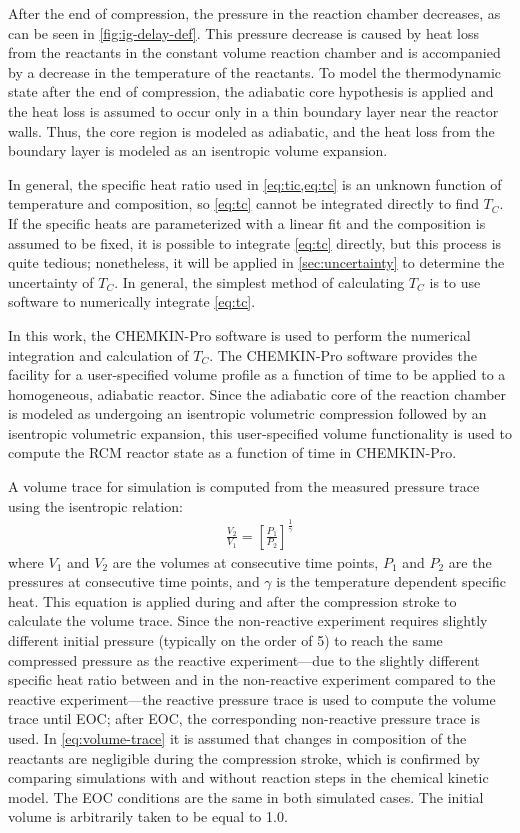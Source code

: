 \documentclass[../main.tex]{subfiles}
\begin{document}
After the end of compression, the pressure in the reaction chamber
decreases, as can be seen in \cref{fig:ig-delay-def}. This pressure
decrease is caused by heat loss from the reactants in the constant volume reaction
chamber and is accompanied by a decrease in the temperature of the
reactants. To model the thermodynamic state after the end of compression,
the adiabatic core hypothesis is applied and the heat loss is
assumed to occur only in a thin boundary layer near the reactor walls.
Thus, the core region is modeled as adiabatic, and the heat loss
from the boundary layer is modeled as an isentropic volume
expansion.

In general, the specific heat ratio used in \cref{eq:tic,eq:tc} is an
unknown function of temperature and composition, so \cref{eq:tc}
cannot be integrated directly to find $T_C$. If the specific heats are
parameterized with a linear fit and the composition is assumed to be
fixed, it is possible to integrate \cref{eq:tc} directly, but this
process is quite tedious; nonetheless, it will be applied in
\cref{sec:uncertainty} to determine the uncertainty of $T_C$. In
general, the simplest method of calculating $T_C$ is to use software
to numerically integrate \cref{eq:tc}.

In this work, the CHEMKIN-Pro \cite{Chemkin2012} software is used to
perform the numerical integration and calculation of $T_C$. The
CHEMKIN-Pro software provides the facility for a user-specified
volume profile as a function of time to be applied to a homogeneous,
adiabatic reactor. Since the adiabatic core of the reaction chamber
is modeled as undergoing an isentropic volumetric compression followed
by an isentropic volumetric expansion, this user-specified volume
functionality is used to compute the RCM reactor state as a function
of time in CHEMKIN-Pro.

A volume trace for simulation is computed from the measured
pressure trace using the isentropic relation:
%
\begin{align}
\frac{V_2}{V_1} = \left[\frac{P_1}{P_2}\right]^{\frac{1}{\gamma}}
\label{eq:volume-trace}
\end{align}
%
where $V_1$ and $V_2$ are the volumes at consecutive time points,
$P_1$ and $P_2$ are the pressures at consecutive time points, and
$\gamma$ is the temperature dependent specific heat. This equation
is applied during and after the compression stroke to calculate
the volume trace. Since the non-reactive experiment requires slightly
different initial pressure (typically on the order of \SI{5}{\torr}) to reach the same
compressed pressure as the reactive experiment---due to the slightly
different specific heat ratio between  and  in the non-reactive experiment compared
to the reactive experiment---the reactive pressure trace is used to
compute the volume trace until EOC; after EOC, the corresponding
non-reactive pressure trace is used. In \cref{eq:volume-trace} it is assumed that
changes in composition of the reactants are negligible during the
compression stroke, which is confirmed by comparing simulations with and
without reaction steps in the chemical kinetic model. The EOC conditions
are the same in both simulated cases. The initial volume is arbitrarily taken
to be equal to \num{1.0}.
\end{document}
